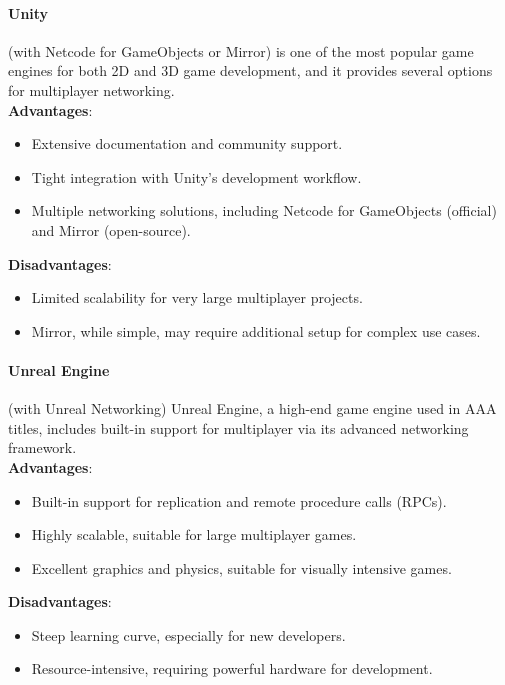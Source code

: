 \documentclass{article} %
\begin{document}
\paragraph{Unity} (with Netcode for GameObjects or Mirror)
is one of the most popular game engines for both 2D and 3D game development,
and it provides several options for multiplayer networking.
\\
\textbf{Advantages}:
\begin{itemize}
	\item Extensive documentation and community support.
	\item Tight integration with Unity's development workflow.
	\item Multiple networking solutions, including Netcode for GameObjects (official) and Mirror (open-source).
\end{itemize}
\textbf{Disadvantages}:
\begin{itemize}
	\item Limited scalability for very large multiplayer projects.
	\item Mirror, while simple, may require additional setup for complex use cases.
\end{itemize}

\paragraph{Unreal Engine} (with Unreal Networking) Unreal Engine,
a high-end game engine used in AAA titles, includes built-in support for multiplayer via its advanced networking framework.
\\
\textbf{Advantages}:
\begin{itemize}
	\item Built-in support for replication and remote procedure calls (RPCs).
	\item Highly scalable, suitable for large multiplayer games.
	\item Excellent graphics and physics, suitable for visually intensive games.
\end{itemize}
\textbf{Disadvantages}:
\begin{itemize}
	\item Steep learning curve, especially for new developers.
	\item Resource-intensive, requiring powerful hardware for development.
\end{itemize}
\end{document}
